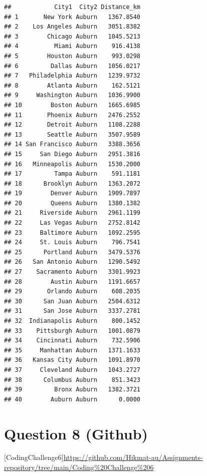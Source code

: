 \documentclass[
]{article}
\begin{document}
\begin{verbatim}
##            City1  City2 Distance_km
## 1       New York Auburn   1367.8540
## 2    Los Angeles Auburn   3051.8382
## 3        Chicago Auburn   1045.5213
## 4          Miami Auburn    916.4138
## 5        Houston Auburn    993.0298
## 6         Dallas Auburn   1056.0217
## 7   Philadelphia Auburn   1239.9732
## 8        Atlanta Auburn    162.5121
## 9     Washington Auburn   1036.9900
## 10        Boston Auburn   1665.6985
## 11       Phoenix Auburn   2476.2552
## 12       Detroit Auburn   1108.2288
## 13       Seattle Auburn   3507.9589
## 14 San Francisco Auburn   3388.3656
## 15     San Diego Auburn   2951.3816
## 16   Minneapolis Auburn   1530.2000
## 17         Tampa Auburn    591.1181
## 18      Brooklyn Auburn   1363.2072
## 19        Denver Auburn   1909.7897
## 20        Queens Auburn   1380.1382
## 21     Riverside Auburn   2961.1199
## 22     Las Vegas Auburn   2752.8142
## 23     Baltimore Auburn   1092.2595
## 24     St. Louis Auburn    796.7541
## 25      Portland Auburn   3479.5376
## 26   San Antonio Auburn   1290.5492
## 27    Sacramento Auburn   3301.9923
## 28        Austin Auburn   1191.6657
## 29       Orlando Auburn    608.2035
## 30      San Juan Auburn   2504.6312
## 31      San Jose Auburn   3337.2781
## 32  Indianapolis Auburn    800.1452
## 33    Pittsburgh Auburn   1001.0879
## 34    Cincinnati Auburn    732.5906
## 35     Manhattan Auburn   1371.1633
## 36   Kansas City Auburn   1091.8970
## 37     Cleveland Auburn   1043.2727
## 38      Columbus Auburn    851.3423
## 39         Bronx Auburn   1382.3721
## 40        Auburn Auburn      0.0000
\end{verbatim}

\section{Question 8 (Github)}\label{question-8-github}

{[}CodingChallenge6{]}\url{https://github.com/Hikmat-au/Assignments-repository/tree/main/Coding\%20Challenge\%206}
\end{document}
